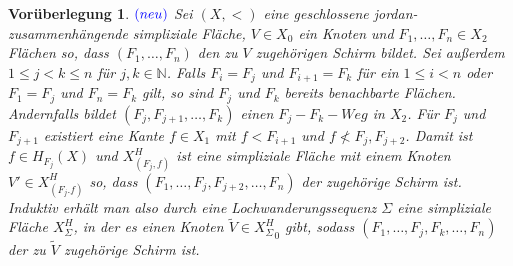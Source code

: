 \documentclass[12pt,titlepage]{article}
\newcommand{\gelb}{0.550000011920929}
\newtheorem{vor}{Vorüberlegung}[section]
\begin{document}
\begin{vor} \label{vor2} $\textcolor{blue}{(neu)}$ 
Sei $(X,<)$ eine geschlossene jordan-zusammenhängende simpliziale Fläche, $V\in X_0$ ein Knoten und $F_1,\ldots,F_n \in X_2$ Flächen so, dass $(F_1,\ldots,F_n)$ den zu $V$ zugehörigen Schirm bildet. Sei außerdem $1 \leq j<k\leq n$ für $j,k \in \mathbb{N}$. Falls $F_i=F_j$ und $F_{i+1}=F_k$ für ein $1 \leq i < n$ oder $F_1=F_j$ und $F_n=F_k$ gilt, so sind $F_j$ und $F_k$ bereits benachbarte Flächen. Andernfalls bildet $(F_j,F_{j+1},\ldots,F_k)$ einen $F_j-F_k-Weg$ in $X_2$. Für $F_j$ und $F_{j+1}$ existiert eine Kante $f \in X_1$ mit $f<F_{i+1}$ und $f \nless F_j,F_{j+2}$. Damit ist $f \in H_{F_j}(X)$ und $X^H_{(F_j,f)}$ ist eine simpliziale Fläche mit einem Knoten $V'\in X^H_{(F_j.f)}$ so, dass $(F_1,\ldots,F_j,F_{j+2},\ldots,F_n)$ der zugehörige Schirm ist. Induktiv erhält man also durch eine Lochwanderungssequenz $\Sigma$ eine simpliziale Fläche $X_{\Sigma}^H$, in der es einen Knoten $\tilde{V} \in {X_{\Sigma}^H}_0$ gibt, sodass $(F_1,\ldots,F_j,F_k,\ldots,F_n)$ der zu $\tilde{V}$ zugehörige Schirm ist.
\begin{comment}
\begin{figure}[H]
\definecolor{ududff}{rgb}{0.30196078431372547,0.30196078431372547,1.}
\definecolor{xdxdff}{rgb}{0.49019607843137253,0.49019607843137253,1.}
\definecolor{ffffqq}{rgb}{1.,1.,0.}
\definecolor{qqqqff}{rgb}{0.,0.,1.}
\begin{tikzpicture}[line cap=round,line join=round,>=triangle 45,x=.6cm,y=.6cm]
\begin{axis}[
x=.6cm,y=.6cm,
axis lines=middle,
ymajorgrids=true,
xmajorgrids=true,
xmin=0.528648275564196,
xmax=24.56924864269519,
ymin=-6.103382960803373,
ymax=6.063251311953354,
xtick={2.0,4.0,...,24.0},
ytick={-6.0,-4.0,...,6.0},]
\clip(0.528648275564196,-6.103382960803373) rectangle (24.56924864269519,6.063251311953354);
\fill[line width=2.pt,color=ffffqq,fill=ffffqq,fill opacity=\gelb] (2.,4.) -- (2.,-4.) -- (10.,-4.) -- (10.,4.) -- cycle;
\fill[line width=2.pt,color=ffffqq,fill=ffffqq,fill opacity=\gelb] (14.,4.) -- (14.,-4.) -- (22.,-4.) -- (22.,4.) -- cycle;
\draw [line width=2.pt] (6.,0.)-- (8.94,0.);
\draw [line width=2.pt] (8.94,0.)-- (7.47,2.5461146871262494);
\draw [line width=2.pt] (7.47,2.5461146871262494)-- (6.,0.);
\draw [line width=2.pt] (8.94,0.)-- (6.,0.);
\draw [line width=2.pt] (6.,0.)-- (7.47,-2.5461146871262494);
\draw [line width=2.pt] (7.47,-2.5461146871262494)-- (8.94,0.);
\draw [line width=2.pt] (6.,0.)-- (7.47,-2.5461146871262494);
\draw [line width=2.pt] (7.47,-2.5461146871262494)-- (8.94,0.);

\end{comment}
\end{vor}
\end{document}

